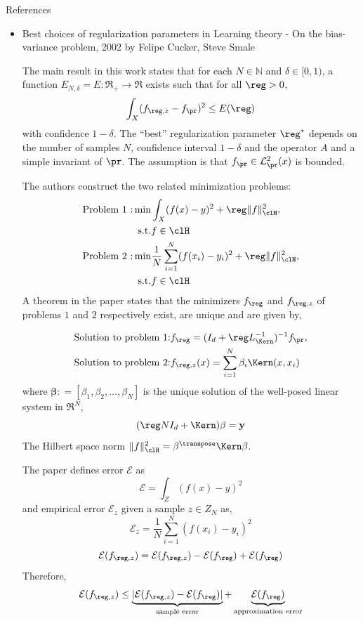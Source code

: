 References
\begin{itemize}
\item Best choices of regularization parameters in Learning theory - On the bias-variance problem, 2002 by Felipe Cucker, Steve Smale


The main result in this work states that for each $N\in \mathbb{N}$ and $\delta \in [0,1)$, a function $E_{N,\delta} = E : \Re_+ \to \Re$ exists such that for all $\reg >0$,
\[
\int_X (f_{\reg,z} - f_\pr)^2 \leq E(\reg)
\]
with confidence $1-\delta$. The ``best'' regularization parameter $\reg^*$ depends on the number of samples $N$, confidence interval $1-\delta$ and the operator $A$ and a simple invariant of $\pr$. The assumption is that $f_\pr \in \mathcal{L}^2_\pr(x)$ is bounded. 

The authors construct the two related minimization problems: 
\[
\begin{aligned}
\text{Problem 1 :} \min & \int_X(f(x) - y)^2 + \reg \|f\|^2_\clH, \\
\text{s.t.} & f \in \clH \\
%
\text{Problem 2 :} \min & \frac{1}{N} \sum_{i=1}^N (f(x_i) - y_i)^2 + \reg \|f\|^2_\clH,\\
\text{s.t.} & f \in \clH
\end{aligned}
\]
A theorem in the paper states that the minimizers $f_\reg$ and $f_{\reg,z}$ of problems $1$ and $2$ respectively exist, are unique and are given by, 

\[
\begin{aligned}
\text{Solution to problem 1:} &
f_\reg = (I_d + \reg L_\Kern^{-1})^{-1} f_\pr, \\
\text{Solution to problem 2:} & 
f_{\reg,z}(x) = \sum_{i=1}^N \beta_i \Kern(x,x_i)
\end{aligned}
\]
where $\mathbf{\beta}: = [\beta_1, \beta_2, \hdots, \beta_N]$ is the unique solution of the well-posed linear system in $\Re^N$,
\[
(\reg N I_d + \Kern) \mathbf{\beta} = \mathbf{y}
\]
The Hilbert space norm $\|f\|^2_\clH = \beta^\transpose \Kern \beta$.

The paper defines error $\mathcal{E}$ as 
\[
\mathcal{E} = \int_Z (f(x) - y)^2
\]
and empirical error $\mathcal{E}_z$ given a sample $z \in Z_N$ as,
\[
\mathcal{E}_z = \frac{1}{N} \sum_{i=1}^N (f(x_i) - y_i)^2
\]
\[
\mathcal{E}(f_{\reg,z}) = \mathcal{E}(f_{\reg, z }) - \mathcal{E}(f_\reg) + \mathcal{E}(f_\reg)
\]
Therefore, 
\[
\mathcal{E}(f_{\reg,z}) \leq \underbrace{|\mathcal{E}(f_{\reg,z}) - \mathcal{E}(f_\reg)|}_{\text{sample error}} + \underbrace{\mathcal{E}(f_\reg)}_{\text{approximation error}}
\]


\end{itemize}
